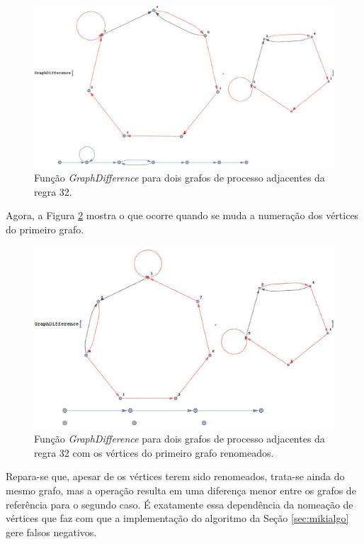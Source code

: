 \documentclass[12pt,a4paper]{article}
\begin{document}
\begin{figure}[htp]
\begin{center}
\includegraphics[scale=0.4]{img/GraphDifference1.eps}
\caption{Função \textit{GraphDifference} para dois grafos de processo
adjacentes da regra 32.}
\label{fig:gd1}
\end{center}
\end{figure}

Agora, a Figura \ref{fig:gd2} mostra o que ocorre quando se muda a numeração
dos vértices do primeiro grafo.

\begin{figure}[htp]
\begin{center}
\includegraphics[scale=0.4]{img/GraphDifference2.eps}
\caption{Função \textit{GraphDifference} para dois grafos de processo
adjacentes da regra 32 com os vértices do primeiro grafo renomeados.}
\label{fig:gd2}
\end{center}
\end{figure}

Repara-se que, apesar de os vértices terem sido renomeados, trata-se ainda do
mesmo grafo, mas a operação resulta em uma diferença
menor entre os grafos de referência para o segundo caso. É exatamente essa
dependência da nomeação de vértices que faz com que a implementação do
algoritmo da Seção \ref{sec:mikialgo} gere falsos negativos.
\end{document}
